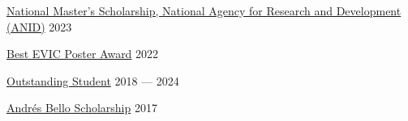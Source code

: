 \href{https://s3.amazonaws.com/documentos.anid.cl/BecasChile/2023/MagisterNacional/POSTULANTES_MagNac_2023.pdf}{National Master's Scholarship, National Agency for Research and Development (ANID)} \hfill 2023

\href{https://www.evic.cl/?page_id=235#testimonio}{Best EVIC Poster Award} \hfill 2022

\href{https://ingenieria.uchile.cl/escuela/la-escuela/distinciones/alumnos-destacados-2022}{Outstanding Student} \hfill 2018 --- 2024

\href{https://uchile.cl/dam/jcr:2c08cf3c-6d82-47c0-9996-1b67d3e4b545/1678118110N%C3%B3minaBAB_transparencia_2022.pdf}{Andrés Bello Scholarship} \hfill 2017

